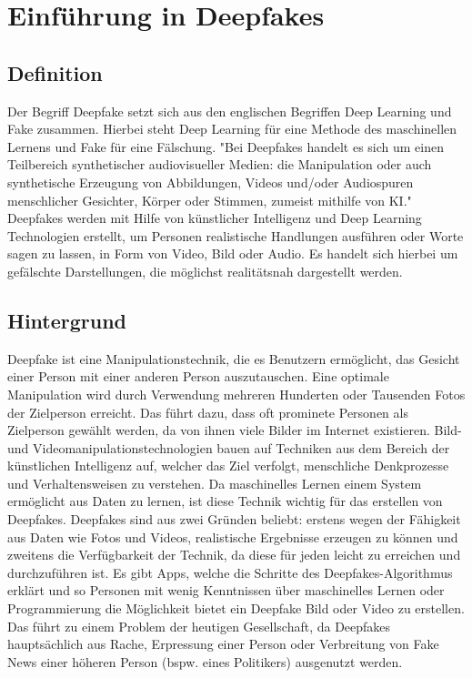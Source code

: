 \section{Einführung in Deepfakes}
\subsection{Definition}
Der Begriff Deepfake setzt sich aus den englischen Begriffen Deep Learning und Fake zusammen. Hierbei steht Deep Learning für eine Methode des maschinellen Lernens und Fake für eine Fälschung.\newline
"Bei Deepfakes handelt es sich um einen Teilbereich synthetischer audiovisueller Medien: die Manipulation oder auch synthetische Erzeugung von Abbildungen, Videos und/oder Audiospuren menschlicher Gesichter, Körper oder Stimmen, zumeist mithilfe von KI."\cite{SpringerLink}
\cite{SpringerLink}
\newline
Deepfakes werden mit Hilfe von künstlicher Intelligenz und Deep Learning Technologien erstellt, um Personen realistische Handlungen ausführen oder Worte sagen zu lassen, in Form von Video, Bild oder Audio. Es handelt sich hierbei um gefälschte Darstellungen, die möglichst realitätsnah dargestellt werden.\cite{ScienceDirect}

\subsection{Hintergrund}
Deepfake ist eine Manipulationstechnik, die es Benutzern ermöglicht, das Gesicht einer Person mit einer anderen Person auszutauschen. Eine optimale Manipulation wird durch Verwendung mehreren Hunderten oder Tausenden Fotos der Zielperson erreicht. Das führt dazu, dass oft prominete Personen als Zielperson gewählt werden, da von ihnen viele Bilder im Internet existieren.\newline
Bild- und Videomanipulationstechnologien bauen auf Techniken aus dem Bereich der künstlichen Intelligenz auf, welcher das Ziel verfolgt, menschliche Denkprozesse und Verhaltensweisen zu verstehen.
Da maschinelles Lernen einem System ermöglicht aus Daten zu lernen, ist diese Technik wichtig für das erstellen von Deepfakes. \newline
Deepfakes sind aus zwei Gründen beliebt: erstens wegen der Fähigkeit aus Daten wie Fotos und Videos, realistische Ergebnisse erzeugen zu können und zweitens die Verfügbarkeit der Technik, da diese für jeden leicht zu erreichen und durchzuführen ist.
Es gibt Apps, welche die Schritte des Deepfakes-Algorithmus erklärt und so Personen mit wenig Kenntnissen über maschinelles Lernen oder Programmierung die Möglichkeit bietet ein Deepfake Bild oder Video zu erstellen. \newline
Das führt zu einem Problem der heutigen Gesellschaft, da Deepfakes hauptsächlich aus Rache, Erpressung einer Person oder Verbreitung von Fake News einer höheren Person (bspw. eines Politikers) ausgenutzt werden.\cite{Jatit}


